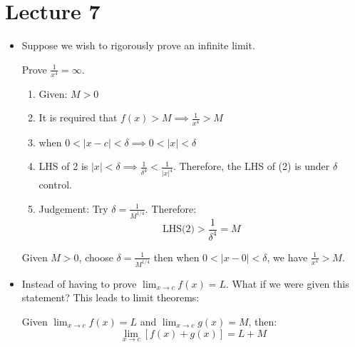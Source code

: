 \section{Lecture 7}
\begin{itemize}
    \item Suppose we wish to rigorously prove an infinite limit.
    \begin{example}
        Prove $\displaystyle\frac{1}{x^4}=\infty$.
        \begin{enumerate}
            \item Given: $M>0$
            \item It is required that $f(x)>M \implies \frac{1}{x^4} > M$
            \item when $0<|x-c|<\delta \implies 0<|x|<\delta$
            \item LHS of 2 is $|x|<\delta \implies \frac{1}{\delta^4} < \frac{1}{|x|^4}$. Therefore, the LHS of (2) is under $\delta$ control.
            \item Judgement: Try $\delta=\frac{1}{M^{1/4}}$. Therefore:
            \begin{equation}
                \text{LHS(2)} > \frac{1}{\delta^4} = M
                \label{eq:}
            \end{equation}
        \end{enumerate}
        Given $M>0$, choose $\delta=\frac{1}{M^{1/4}}$ then when $0<|x-0|<\delta$, we have $\frac{1}{x^4}>M$.
    \end{example}
    \item Instead of having to prove $\displaystyle \lim_{x\to c} f(x)=L$. What if we were given this statement? This leads to limit theorems:
    \begin{theorem}
        Given $\displaystyle\lim_{x\to c}f(x)=L$ and $\displaystyle\lim_{x\to c}g(x)=M$, then:
        \begin{equation}
            \lim_{x\to c}\left[f(x)+g(x)\right]=L+M
            \label{eq:}
        \end{equation}
        

\end{theorem}
\end{itemize}
